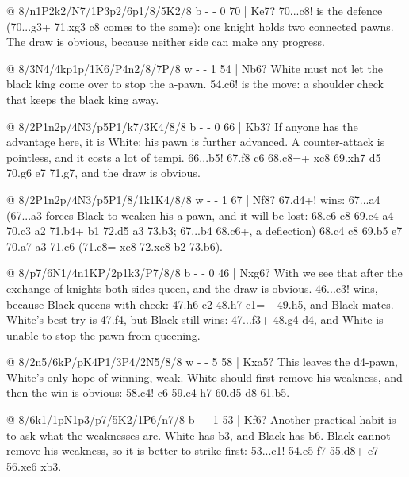 @ 8/n1P2k2/N7/1P3p2/6p1/8/5K2/8 b - - 0 70 | Ke7?
70...\N c8! is the defence (70...g3+ 71.\K xg3 \N c8 comes to the same): one knight holds two
connected pawns. The draw is
obvious, because neither side can make any progress.

@ 8/3N4/4kp1p/1K6/P4n2/8/7P/8 w - - 1 54 | Nb6?
White must not let the black king come over to stop the a-pawn. 54.\K c6! is the move: a shoulder
check that keeps the black king away.

@ 8/2P1n2p/4N3/p5P1/k7/3K4/8/8 b - - 0 66 | Kb3?
If anyone has the advantage here, it is White: his pawn is further advanced. A counter-attack is
pointless, and it costs a lot of tempi. 66...\K b5! 67.\N f8 \K c6 68.c8=\Q+ \N xc8 69.\N xh7 \K d5
70.g6 \N e7 71.g7, and the draw is obvious.

@ 8/2P1n2p/4N3/p5P1/8/1k1K4/8/8 w - - 1 67 | Nf8?
67.\N d4+! wins: 67...\K a4 (67...\K a3 forces Black to weaken his a-pawn, and it will be lost:
68.\N c6 \N c8 69.\K c4 a4 70.\K c3 \K a2 71.\N b4+ \K b1 72.\N d5 a3 73.\K b3; 67...\K b4
68.\N c6+, a deflection) 68.\K c4 \N c8 69.\N b5 \N e7 70.\N a7 \K a3
71.\N c6 (71.c8=\Q{} \N xc8 72.\N xc8 \K b2 73.\N b6).

@ 8/p7/6N1/4n1KP/2p1k3/P7/8/8 b - - 0 46 | Nxg6?
With  we see that after the exchange of knights both sides
queen, and the draw is obvious. 46...c3! wins, because Black
queens with check: 47.h6 c2 48.h7 c1=\Q+ 49.\K h5, and Black
mates. White's best try is 47.\N f4, but Black still wins: 47...\N f3+ 48.\K g4 \N d4, and White
is unable to stop the pawn from queening.

@ 8/2n5/6kP/pK4P1/3P4/2N5/8/8 w - - 5 58 | Kxa5?
This leaves the d4-pawn, White's only hope of winning, weak. White should first remove his
weakness, and then the win is obvious: 58.\K c4! \N e6
59.\N e4 \K h7 60.d5 \N d8 61.\K b5.

@ 8/6k1/1pN1p3/p7/5K2/1P6/n7/8 b - - 1 53 | Kf6?
Another practical habit is to ask what the weaknesses are. White has b3, and Black has b6. Black
cannot remove his weakness, so it is better to strike first: 53...\N c1! 54.\K e5 \K f7 55.\N d8+
\K e7 56.\N xe6 \N xb3.

